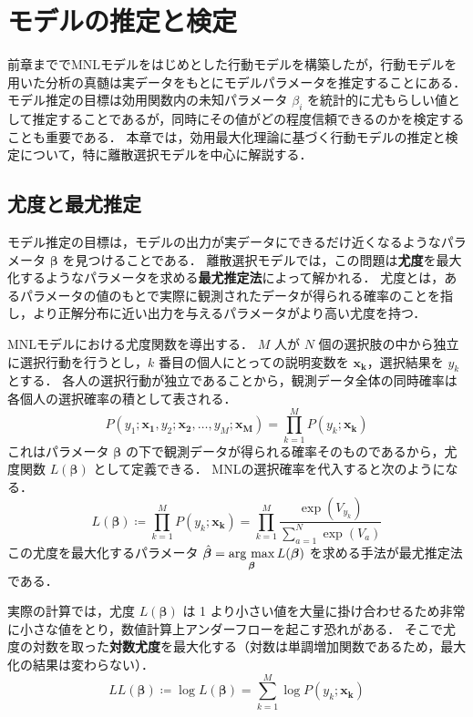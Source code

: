 
\section{モデルの推定と検定}
前章まででMNLモデルをはじめとした行動モデルを構築したが，行動モデルを用いた分析の真髄は実データをもとにモデルパラメータを推定することにある．
モデル推定の目標は効用関数内の未知パラメータ $\beta_i$ を統計的に尤もらしい値として推定することであるが，同時にその値がどの程度信頼できるのかを検定することも重要である．
本章では，効用最大化理論に基づく行動モデルの推定と検定について，特に離散選択モデルを中心に解説する． 

\subsection{尤度と最尤推定}\label{sec:likelihood}
モデル推定の目標は，モデルの出力が実データにできるだけ近くなるようなパラメータ $\bm{\beta}$ を見つけることである．
離散選択モデルでは，この問題は\textbf{尤度}を最大化するようなパラメータを求める\textbf{最尤推定法}によって解かれる．
尤度とは，あるパラメータの値のもとで実際に観測されたデータが得られる確率のことを指し，より正解分布に近い出力を与えるパラメータがより高い尤度を持つ．

MNLモデルにおける尤度関数を導出する．
$M$ 人が $N$ 個の選択肢の中から独立に選択行動を行うとし，$k$ 番目の個人にとっての説明変数を $\bm{x_k}$，選択結果を $y_k$ とする．
各人の選択行動が独立であることから，観測データ全体の同時確率は各個人の選択確率の積として表される．
\begin{equation}
    \label{eq:joint_prob}
    P(y_1;\bm{x_1},y_2;\bm{x_2},\ldots,y_M;\bm{x_M}) = \prod_{k=1}^M P(y_k;\bm{x_k})
\end{equation}
これはパラメータ $\bm{\beta}$ の下で観測データが得られる確率そのものであるから，尤度関数 $L(\bm\beta)$ として定義できる．
MNLの選択確率を代入すると次のようになる．
\begin{equation}
    \label{eq:likelihood}
    L(\bm\beta) \coloneq \prod_{k=1}^M P(y_k;\bm{x_k}) = \prod_{k=1}^M\frac{\exp(V_{y_k})}{\sum_{a=1}^N \exp(V_a)}
\end{equation}
この尤度を最大化するパラメータ $\hat{\bm\beta} = \mathop{\rm arg~max}\limits_{\bm\beta} L(\bm\beta)$ を求める手法が最尤推定法である．

実際の計算では，尤度 $L(\bm\beta)$ は 1 より小さい値を大量に掛け合わせるため非常に小さな値をとり，数値計算上アンダーフローを起こす恐れがある．
そこで尤度の対数を取った\textbf{対数尤度}を最大化する（対数は単調増加関数であるため，最大化の結果は変わらない）．
\begin{equation}
    \label{eq:log_likelihood}
    LL(\bm\beta) \coloneq\log L(\bm\beta) = \sum_{k=1}^M \log P(y_k;\bm{x_k})
\end{equation}

